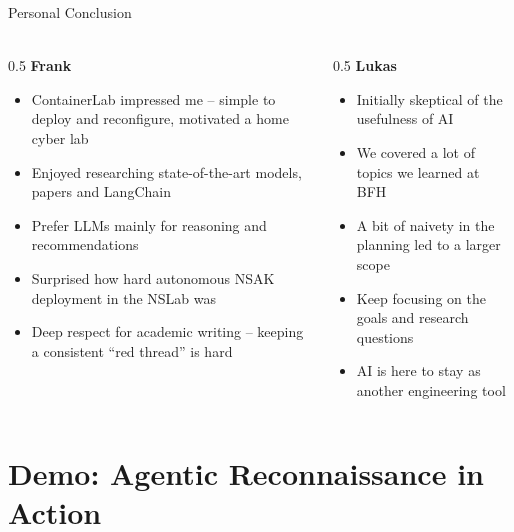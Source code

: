 \begin{frame}{Personal Conclusion}
    \framesubtitle{}
    \begin{columns}[T,onlytextwidth]
        \begin{column}{0.5\textwidth}
            \textbf{Frank}
            \begin{itemize}
                \item ContainerLab impressed me -- simple to deploy and reconfigure, motivated a home cyber lab
                \item Enjoyed researching state-of-the-art models, papers and LangChain
                \item Prefer LLMs mainly for reasoning and recommendations
                \item Surprised how hard autonomous NSAK deployment in the NSLab was
                \item Deep respect for academic writing -- keeping a consistent ``red thread'' is hard
            \end{itemize}
        \end{column}
        \begin{column}{0.5\textwidth}
            \textbf{Lukas}
            \begin{itemize}
                \item Initially skeptical of the usefulness of AI
                \item We covered a lot of topics we learned at BFH
                \item A bit of naivety in the planning led to a larger scope
                \item Keep focusing on the goals and research questions
                \item AI is here to stay as another engineering tool
            \end{itemize}
        \end{column}
    \end{columns}
\end{frame}


\section[Demo]{Demo: Agentic Reconnaissance in Action}\label{sec:demo-and-questions}
